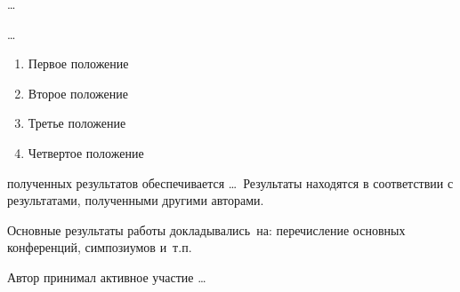 {\influence} \ldots

{\methods} \ldots

{}
\begin{enumerate}[beginpenalty=10000] %
  \item Первое положение
  \item Второе положение
  \item Третье положение
  \item Четвертое положение
\end{enumerate}

{\reliability} полученных результатов обеспечивается \ldots \ Результаты находятся в соответствии с результатами, полученными другими авторами.


{\probation}
Основные результаты работы докладывались~на:
перечисление основных конференций, симпозиумов и~т.\:п.

{\contribution} Автор принимал активное участие \ldots

